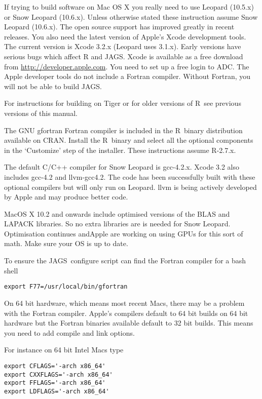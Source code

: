 \documentclass[11pt, a4paper, titlepage]{article}
\newcommand{\JAGS}{\textsf{JAGS}}
\newcommand{\R}{\textsf{R}}
\begin{document}
If trying to build software on Mac OS X you really need to use Leopard
(10.5.x) or Snow Leopard (10.6.x). Unless otherwise stated these
instruction assume Snow Leopard (10.6.x). The open source support has
improved greatly in recent releases. You also need the latest version
of Apple's Xcode development tools. The current version is Xcode 3.2.x
(Leopard uses 3.1.x).  Early versions have serious bugs which affect R
and \JAGS.  Xcode is available as a free download from
\url{http://developer.apple.com}. You need to set up a free login to
ADC. The Apple developer tools do not include a Fortran
compiler. Without Fortran, you will not be able to build \JAGS.

For instructions for building on Tiger or for older versions of
\R\ see previous versions of this manual.

The GNU gfortran Fortran compiler is included in the \R\ binary
distribution available on CRAN. Install the \R\ binary and select all
the optional components in the `Customize' step of the installer.
These instructions assume R-2.7.x.

The default C/C++ compiler for Snow Leopard is gcc-4.2.x. Xcode 3.2
also includes gcc-4.2 and llvm-gcc4.2.  The code has been successfully
built with these optional compilers but will only run on Leopard.
llvm is being actively developed by Apple and may produce better code.

MacOS X 10.2 and onwards include optimised versions of the BLAS and
LAPACK libraries.  So no extra libraries are is needed for Snow
Leopard.  Optimisation continues andApple are working on using GPUs
for this sort of math.  Make sure your OS is up to date.

To ensure the \JAGS\ configure script can find the Fortran compiler
for a bash shell
\begin{verbatim}
export F77=/usr/local/bin/gfortran
\end{verbatim}

On 64 bit hardware, which means most recent Macs, there may be a 
problem with the Fortran compiler.  Apple's compilers default to 64 bit 
builds on 64 bit hardware but the Fortran binaries available default to 
32 bit builds. This means you need to add compile and link options.

For instance on 64 bit Intel Macs type
\begin{verbatim}
export CFLAGS='-arch x86_64'
export CXXFLAGS='-arch x86_64'
export FFLAGS='-arch x86_64'
export LDFLAGS='-arch x86_64'
\end{verbatim}
\end{document}
